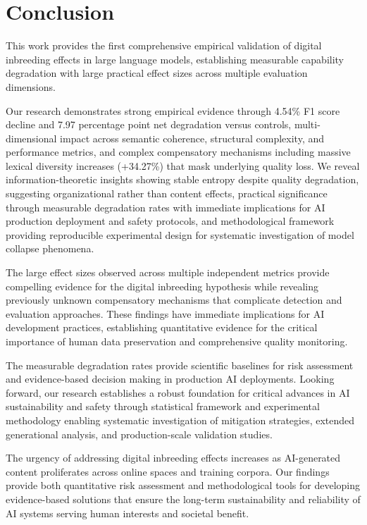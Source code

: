 \documentclass{article}
\begin{document}
\section{Conclusion}

This work provides the first comprehensive empirical validation of digital inbreeding effects in large language models, establishing measurable capability degradation with large practical effect sizes across multiple evaluation dimensions.

Our research demonstrates strong empirical evidence through 4.54\% F1 score decline and 7.97 percentage point net degradation versus controls, multi-dimensional impact across semantic coherence, structural complexity, and performance metrics, and complex compensatory mechanisms including massive lexical diversity increases (+34.27\%) that mask underlying quality loss. We reveal information-theoretic insights showing stable entropy despite quality degradation, suggesting organizational rather than content effects, practical significance through measurable degradation rates with immediate implications for AI production deployment and safety protocols, and methodological framework providing reproducible experimental design for systematic investigation of model collapse phenomena.

The large effect sizes observed across multiple independent metrics provide compelling evidence for the digital inbreeding hypothesis while revealing previously unknown compensatory mechanisms that complicate detection and evaluation approaches. These findings have immediate implications for AI development practices, establishing quantitative evidence for the critical importance of human data preservation and comprehensive quality monitoring.

The measurable degradation rates provide scientific baselines for risk assessment and evidence-based decision making in production AI deployments. Looking forward, our research establishes a robust foundation for critical advances in AI sustainability and safety through statistical framework and experimental methodology enabling systematic investigation of mitigation strategies, extended generational analysis, and production-scale validation studies.

The urgency of addressing digital inbreeding effects increases as AI-generated content proliferates across online spaces and training corpora. Our findings provide both quantitative risk assessment and methodological tools for developing evidence-based solutions that ensure the long-term sustainability and reliability of AI systems serving human interests and societal benefit.
\end{document}
